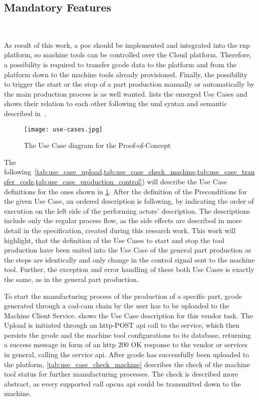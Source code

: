 \documentclass[
a4paper,
twoside,
headsepline,
cleardoublepage=empty,
parskip=half,
draft=false
]{scrbook}
\begin{document}
			\subsection{Mandatory Features} \label{subsec:mandatory}

				As result of this work, a \gls{poc} should be implemented and integrated into the \gls{rnp} platform, so machine tools can be controlled over the Cloud platform.
				Therefore, a possibility is required to transfer \gls{gcode} data to the platform and from the platform down to the machine tools already provisioned.
				Finally, the possibility to trigger the start or the stop of a part production manually or automatically by the main production process is as well wanted.  lists the emerged Use Cases and shows their relation to each other following the \gls{uml} syntax and semantic described in~\cite{uml2017}.

				\begin{figure}[H]
					\centering
					\texttt{[image: use-cases.jpg]}
					\caption{The Use Case diagram for the Proof-of-Concept}
					\label{fig:use_cases}
				\end{figure}

				The following~\cref{tab:use_case_upload,tab:use_case_check_machine,tab:use_case_transfer_code,tab:use_case_production_control}) will describe the Use Case definitions for the ones shown in \cref{fig:use_cases}.
				After the definition of the Preconditions for the given Use Case, an ordered description is following, by indicating the order of execution on the left side of the performing actors' description.
				The descriptions include only the regular process flow, as the side effects are described in more detail in the specification, created during this research work. This work will highlight, that the definition of the Use Cases to start and stop the tool production have been united into the Use Case of the general part production as the steps are identically and only change in the control signal sent to the machine tool. Further, the exception and error handling of these both Use Cases is exactly the same, as in the general part production.
				
				To start the manufacturing process of the production of a specific part, \gls{gcode} generated through a \gls{cad}-\gls{cam} chain by the user has to be uploaded to the Machine Client Service.  shows the Use Case description for this vendor task. The Upload is initiated through an \gls{http}-POST \gls{api} call to the service, which then persists the \gls{gcode} and the machine tool configurations to its database, returning a success message in form of an \gls{http} 200 OK response to the vendor or services in general, calling the service \gls{api}.
				After \gls{gcode} has successfully been uploaded to the platform, \cref{tab:use_case_check_machine} describes the check of the machine tool status for further manufacturing processes. The check is described more abstract, as every supported call \gls{opcua} \gls{api} could be transmitted down to the machine. 
				
\end{document}
